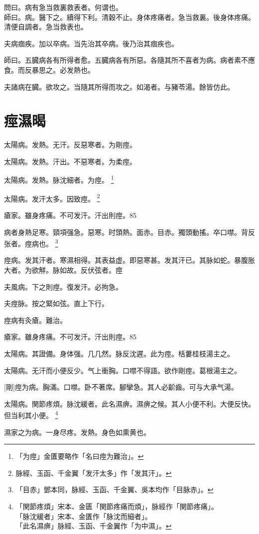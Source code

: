 \documentclass[12pt,oneside,UTF8,b5paper]{ctexbook}她她她她她她她
\begin{document}
問曰。病有急当救裏救表者。何谓也。\\
師曰。病。醫下之。續得下利。清穀不止。身体疼痛者。急当救裏。後身体疼痛。清便自調者。急当救表也。

夫病痼疾。加以卒病。当先治其卒病。後乃治其痼疾也。

師曰。五臓病各有所得者愈。五臓病各有所惡。各隨其所不喜者为病。病者素不應食。而反暴思之。必发熱也。

夫諸病在臓。欲攻之。当隨其所得而攻之。如渴者。与豬苓湯。餘皆仿此。

\chapter{痙濕暍}

太陽病。发熱。无汗。反惡寒者。为剛痙。

太陽病。发熱。汗出。不惡寒者。为柔痙。

太陽病。发熱。脉沈細者。为痙。
	\footnote{「为痙」金匱要略作「名曰痙为難治」。}

太陽病。发汗太多。因致痙。
	\footnote{脉經、玉函、千金翼「发汗太多」作「发其汗」。}

瘡家。雖身疼痛。不可发汗。汗出則痙。85

病者身熱足寒。頸項强急。惡寒。时頭熱。面赤。目赤。獨頭動搖。卒口噤。背反张者。痙病也。
	\footnote{「目赤」鄧本同，脉經、玉函、千金翼、吳本均作「目脉赤」。}

痙病。发其汗者。寒濕相得。其表益虚。即惡寒甚。发其汗已。其脉如蛇。暴腹胀大者。为欲觧。脉如故。反伏弦者。痙

夫風病。下之則痙。復发汗。必拘急。

夫痙脉。按之緊如弦。直上下行。

痙病有灸瘡。難治。

瘡家。雖身疼痛。不可发汗。汗出則痙。85

太陽病。其證備。身体强。几几然。脉反沈遲。此为痙。栝蔞桂枝湯主之。

太陽病。无汗而小便反少。气上衝胸。口噤不得語。欲作剛痙。葛根湯主之。

[剛]痙为病。胸滿。口噤。卧不著席。腳攣急。其人必齘齒。可与大承气湯。

太陽病。関節疼煩。脉沈緩者。此名濕痹。濕痹之候。其人小便不利。大便反快。但当利其小便。
	\footnote{「関節疼煩」宋本、金匮「関節疼痛而煩」，脉經作「関節疼痛」。\\「脉沈緩者」宋本、金匱作「脉沈而細者」。\\「此名濕痹」脉經、玉函、千金翼作「为中濕」。}

濕家之为病。一身尽疼。发熱。身色如熏黄也。
\end{document}
